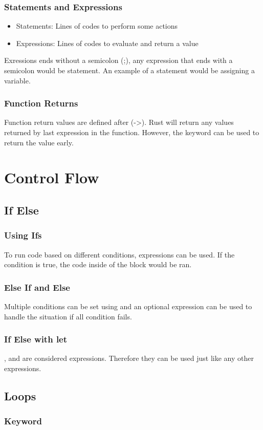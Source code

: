 \documentclass{beamer}
\begin{document}
\begin{frame}
  \frametitle{Statements and Expressions}
  \begin{itemize}
    \item{Statements: Lines of codes to perform some actions}
    \item{Expressions: Lines of codes to evaluate and return a value}
  \end{itemize}
  Exressions ends without a semicolon (;), any expression that ends with a semicolon would be statement. An example of a statement would be assigning a variable.
  
\end{frame}

\begin{frame}
  \frametitle{Function Returns}
  Function return values are defined after (->). Rust will return any values returned by last expression in the function. However, the  keyword can be used to return the value early.
  
\end{frame}

\section{Control Flow}
\subsection{If Else}
\begin{frame}
  \frametitle{Using Ifs}
  To run code based on different conditions,  expressions can be used. If the condition is true, the code inside of the block would be ran.
  
\end{frame}

\begin{frame}
  \frametitle{Else If and Else}
  Multiple conditions can be set using  and an optional  expression can be used to handle the situation if all condition fails.
  
\end{frame}

\begin{frame}
  \frametitle{If Else with let}
  ,  and  are considered expressions. Therefore they can be used just like any other expressions.
  
\end{frame}

\subsection{Loops}
\begin{frame}
  \frametitle{ Keyword}
\end{frame}
\end{document}
